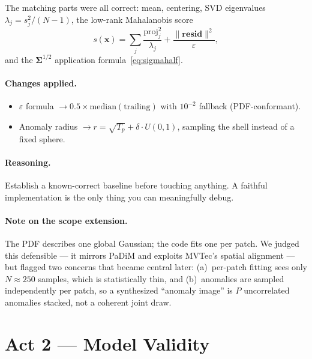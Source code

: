 \documentclass[11pt]{article}
\newcommand{\bSigma}{\boldsymbol{\Sigma}}
\begin{document}
\medskip
\noindent
The matching parts were all correct: mean, centering, SVD eigenvalues
$\lambda_j = s_j^2/(N-1)$, the low-rank Mahalanobis score
\begin{equation}
  s(\mathbf{x}) = \sum_j \frac{\mathrm{proj}_j^2}{\lambda_j}
    + \frac{\lVert \mathbf{resid} \rVert^2}{\varepsilon},
  \label{eq:mahal}
\end{equation}
and the $\bSigma^{1/2}$ application formula~\eqref{eq:sigmahalf}.

\paragraph{Changes applied.}
\begin{itemize}[noitemsep]
  \item $\varepsilon$ formula $\to 0.5 \times \mathrm{median}(\text{trailing})$
    with $10^{-2}$ fallback (PDF-conformant).
  \item Anomaly radius $\to r = \sqrt{T_p} + \delta \cdot U(0,1)$, sampling the
    shell instead of a fixed sphere.
\end{itemize}

\paragraph{Reasoning.}
Establish a known-correct baseline before touching anything. A faithful
implementation is the only thing you can meaningfully debug.

\paragraph{Note on the scope extension.}
The PDF describes one global Gaussian; the code fits one per patch. We judged this
defensible --- it mirrors PaDiM and exploits MVTec's spatial alignment --- but
flagged two concerns that became central later: (a)~per-patch fitting sees only
$N \approx 250$ samples, which is statistically thin, and (b)~anomalies are
sampled independently per patch, so a synthesized ``anomaly image'' is $P$
uncorrelated anomalies stacked, not a coherent joint draw.

\section{Act 2 --- Model Validity}
\end{document}
